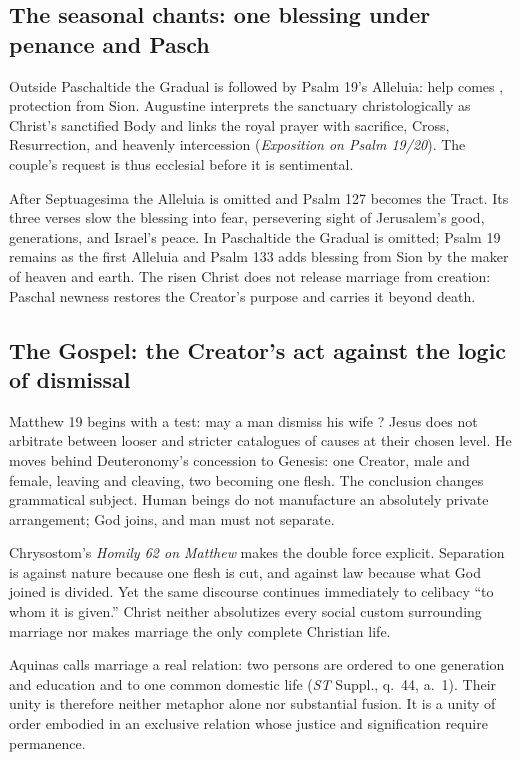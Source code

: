 \begin{deepstudy}
\sectionguard
\subsection*{The seasonal chants: one blessing under penance and Pasch\enspace{}}

Outside Paschaltide the Gradual is followed by Psalm 19's Alleluia: help comes , protection from Sion. Augustine interprets the sanctuary christologically as Christ's sanctified Body and links the royal prayer with sacrifice, Cross, Resurrection, and heavenly intercession (\emph{Exposition on Psalm 19/20}). The couple's request is thus ecclesial before it is sentimental.

After Septuagesima the Alleluia is omitted and Psalm 127 becomes the Tract. Its three verses slow the blessing into fear, persevering sight of Jerusalem's good, generations, and Israel's peace. In Paschaltide the Gradual is omitted; Psalm 19 remains as the first Alleluia and Psalm 133 adds blessing from Sion by the maker of heaven and earth. The risen Christ does not release marriage from creation: Paschal newness restores the Creator's purpose and carries it beyond death.

\sectionguard
\subsection*{The Gospel: the Creator's act against the logic of dismissal\enspace{}}

Matthew 19 begins with a test: may a man dismiss his wife ? Jesus does not arbitrate between looser and stricter catalogues of causes at their chosen level. He moves behind Deuteronomy's concession to Genesis: one Creator, male and female, leaving and cleaving, two becoming one flesh. The conclusion changes grammatical subject. Human beings do not manufacture an absolutely private arrangement; God joins, and man must not separate.

Chrysostom's \emph{Homily 62 on Matthew} makes the double force explicit. Separation is against nature because one flesh is cut, and against law because what God joined is divided. Yet the same discourse continues immediately to celibacy ``to whom it is given.'' Christ neither absolutizes every social custom surrounding marriage nor makes marriage the only complete Christian life.

Aquinas calls marriage a real relation: two persons are ordered to one generation and education and to one common domestic life (\emph{ST} Suppl., q.~44, a.~1). Their unity is therefore neither metaphor alone nor substantial fusion. It is a unity of order embodied in an exclusive relation whose justice and signification require permanence.


\end{deepstudy}

